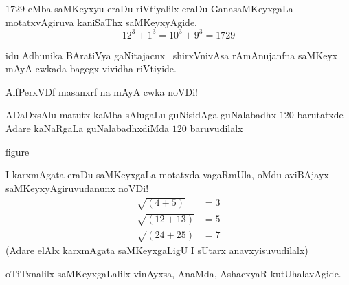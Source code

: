 $1729$ eMba saMKeyxyu eraDu riVtiyalilx eraDu GanasaMKeyxgaLa motatxvAgiruva kaniSaThx saMKeyxyAgide.
$$
12^3 + 1^3 =10^3 + 9 ^3 = 1729
$$

idu Adhunika BAratiVya gaNitajacnx~ shirxVnivAsa rAmAnujanfna saMKeyx mAyA cwkada bagegx vividha riVtiyide.

AlfPerxVDf  masanxrf na mAyA cwka noVDi!

ADaDxsAlu matutx kaMba sAlugaLu guNisidAga guNalabadhx $120$ barutatxde Adare kaNaRgaLa guNalabadhxdiMda $120$ baruvudilalx
\begin{center}
  {\rm figure}
\end{center}

I karxmAgata eraDu saMKeyxgaLa motatxda vagaRmUla, oMdu aviBAjayx saMKeyxyAgiruvudanunx noVDi!
\begin{align*}
  \sqrt{(4+5)} & = 3\\
  \sqrt{(12+13)} & = 5\\
  \sqrt{(24+25)} &= 7
\end{align*}
(Adare elAlx karxmAgata saMKeyxgaLigU I sUtarx anavxyisuvudilalx)

oTiTxnalilx saMKeyxgaLalilx vinAyxsa, AnaMda, AshacxyaR kutUhalavAgide. 



